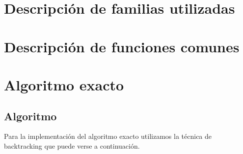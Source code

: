 \documentclass[a4paper, 10pt, twoside]{article}
\begin{document}
\newpage
\section{Descripción de familias utilizadas}


\newpage
\section{Descripción de funciones comunes}




\newpage

\section{Algoritmo exacto}
\subsection{Algoritmo}
Para la implementación del algoritmo exacto utilizamos la técnica de backtracking que puede verse a continuación.
\end{document}
